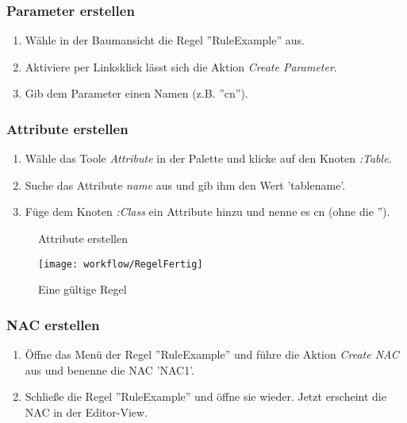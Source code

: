 		\subsubsection{Parameter erstellen}		
			\begin{enumerate}
				\item Wähle in der Baumansicht die Regel ''RuleExample'' aus.
				\item Aktiviere per Linksklick lässt sich die Aktion \textit{Create Parameter}.
				\item Gib dem Parameter einen Namen (z.B. ''cn'').
			\end{enumerate}
			
		\subsubsection{Attribute erstellen}
			\begin{enumerate}
				\item Wähle das Toole \textit{Attribute} in der Palette und klicke auf den Knoten \textit{:Table}.
				\item Suche das Attribute \textit{name} aus und gib ihm den Wert 'tablename'.
				\item Füge dem Knoten \textit{:Class} ein Attribute hinzu und nenne es cn (ohne die '').
			\end{enumerate}
			\begin{figure}[h!]
			    \hfill
				\caption{Attribute erstellen}
			\end{figure} 

			\begin{figure}[h!] %
				\centering
				\texttt{[image: workflow/RegelFertig]}
				\caption{Eine gültige Regel}
				\label{fig:regelFertig}
			\end{figure}

		\subsubsection{NAC erstellen}
			\begin{enumerate}
				\item Öffne das Menü der Regel ''RuleExample'' und führe die Aktion \textit{Create NAC} aus und benenne die NAC 'NAC1'.
				\item Schließe die Regel ''RuleExample'' und öffne sie wieder. Jetzt erscheint die NAC in der Editor-View.
			\end{enumerate}
		
